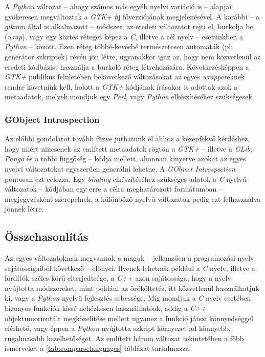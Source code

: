 A \textit{Python} változat -- ahogy számos más egyéb nyelvi variáció is -- alapjai gyökeresen megváltoztak a \textit{GTK+} új főverziójának megjelenésével. A korábbi -- a \textit{gtkmm} által is alkalmazott -- módszer, az eredeti változatot rejti el, burkolja be (\textit{wrap}), vagy egy köztes réteget képez a \textit{C}, illetve a cél nyelv -- esetünkben a \textit{Python} -- között. Ezen réteg többé-kevésbé természetesen automaták (pl: generátor szkriptek) révén jön létre, ugyanakkor igaz az, hogy nem közvetlenül az eredeti kódbázist használja a burkoló réteg létrehozására. Következésképpen a \textit{GTK+} publikus felületében bekövetkező változásokat az egyes \textit{wrapper}eknek rendre követniük kell, holott a \textit{GTK+} kódjának írásakor is adottak azok a metaadatok, melyek mondjuk egy \textit{Perl}, vagy \textit{Python} elkészítéséhez szükségesek.

\subsubsection{GObject Introspection}

Az előbbi gondolatot tovább fűzve juthatunk el ahhoz a kézenfekvő kérdéshez, hogy miért nincsenek az említett metaadatok rögtön a \textit{GTK+} -- illetve a \textit{GLib}, \textit{Pango} és a többi függőség -- kódja mellett, ahonnan kinyerve azokat az egyes nyelvi változatokat egyszerűen generálni lehetne. A \textit{GObject Introspection} pontosan ezt célozza. Egy \textit{binding} elkészítéséhez szükséges adatok a \textit{C} nyelvű változatok -- kódjában egy erre a célra meghatározott formátumban -- megjegyzésként szerepelnek, a különböző nyelvű változatok pedig ezt felhasználva jönnek létre.

\subsection{Összehasonlítás}

Az egyes változatoknak megvannak a maguk -- jellemzően a programozási nyelv sajátosságaiból következő -- előnyei. Ilyenek lehetnek például a \textit{C} nyelv, illetve a fordítók széles körű elterjedtsége, a \textit{C++} azon sajátossága, hogy a nyelv nyújtotta módszereket, mint például az örököltetés, itt közvetlenül használhatjuk ki, vagy a \textit{Python} nyelvű fejlesztés sebessége. Míg mondjuk a \textit{C} nyelv esetében bizonyos funkciók kissé nehézkesen használhatóak, addig a \textit{C++} objektumorientált megközelítése mellett ugyanez a funkció játszi könnyedséggel elérhető, vagy éppen a \textit{Python} nyújtotta szkript környezet ad könnyebb, rugalmasabb kezelhetőséget. Az említett három változat tekintetében a főbb ismérveket a \ref{tab:comparselanguages} táblázat tartalmazza.

